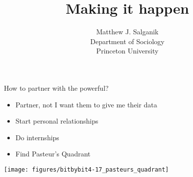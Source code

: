 \documentclass[aspectratio=169]{beamer}
\title[]{Making it happen}
\author[]{Matthew J. Salganik\\Department of Sociology\\Princeton University}
\date[]{Summer Institute in Computational Social Science\\June 24, 2017
\vfill
\begin{flushright}
\vspace{0.6in}
\texttt{[image: figures/cc-by.png]}
\end{flushright}
}
\begin{document}
\frame{\titlepage}
\begin{frame}

\begin{center}
\end{center}

\end{frame}
\begin{frame}

How to partner with the powerful?

\end{frame}
\begin{frame}

\begin{itemize}
\item Partner, not I want them to give me their data
\pause
\item Start personal relationships
\pause
\item Do internships
\pause
\item Find Pasteur's Quadrant
\end{itemize}

\end{frame}
\begin{frame}

\begin{center}
\texttt{[image: figures/bitbybit4-17\_pasteurs\_quadrant]}
\end{center}

\end{frame}
\begin{frame}

\begin{center}
\end{center}

\end{frame}
\end{document}
